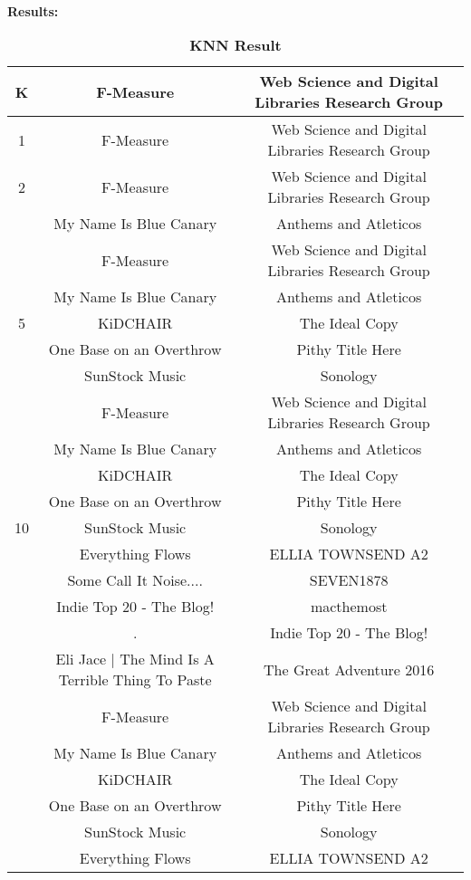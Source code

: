 \documentclass{article}
\begin{document}
		\noindent\\\textbf{Results:}
		\begin{table}[!htb]
			\centering
			\caption{\textbf{KNN Result}}
			\begin{tabular}{ccc}
				\toprule
				\textbf{K} & \textbf{F-Measure} & \textbf{Web Science and Digital Libraries Research Group}\\
				\midrule
				1 & F-Measure & Web Science and Digital Libraries Research Group\\
				\midrule
				2 & F-Measure & Web Science and Digital Libraries Research Group\\
				 & My Name Is Blue Canary & Anthems and Atleticos\\
				\midrule
				 & F-Measure & Web Science and Digital Libraries Research Group\\
				 & My Name Is Blue Canary & Anthems and Atleticos\\
				5 & KiDCHAIR & The Ideal Copy\\
				 & One Base on an Overthrow & Pithy Title Here\\
				 & SunStock Music & Sonology\\
				\midrule
				 & F-Measure & Web Science and Digital Libraries Research Group\\
				 & My Name Is Blue Canary & Anthems and Atleticos\\
				 & KiDCHAIR & The Ideal Copy\\
				 & One Base on an Overthrow & Pithy Title Here\\
				10 & SunStock Music & Sonology\\
				 & Everything Flows & ELLIA TOWNSEND A2\\
				 & Some Call It Noise.... & SEVEN1878\\
				 & Indie Top 20 - The Blog! & macthemost\\
				 & . & Indie Top 20 - The Blog!\\
				 & Eli Jace | The Mind Is A Terrible Thing To Paste & The Great Adventure 2016\\
				\midrule
				 & F-Measure & Web Science and Digital Libraries Research Group\\
				 & My Name Is Blue Canary & Anthems and Atleticos\\
				 & KiDCHAIR & The Ideal Copy\\
				 & One Base on an Overthrow & Pithy Title Here\\
				 & SunStock Music & Sonology\\
				 & Everything Flows & ELLIA TOWNSEND A2\\

\end{tabular}
\end{table}
\end{document}
